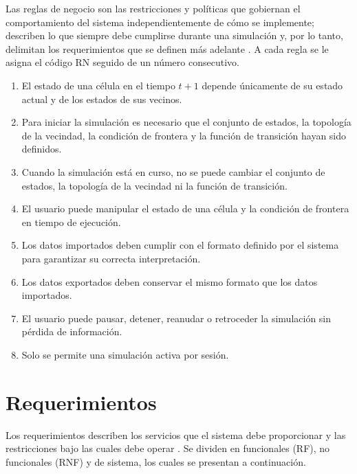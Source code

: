 Las reglas de negocio son las restricciones y políticas que gobiernan el comportamiento del sistema independientemente de cómo se implemente; describen lo que siempre debe cumplirse durante una simulación y, por lo tanto, delimitan los requerimientos que se definen más adelante \cite{ingenieria_1}. A cada regla se le asigna el código RN seguido de un número consecutivo.

\begin{enumerate}[label*=RN\arabic*, noitemsep]
	
	\item El estado de una célula en el tiempo $t + 1$ depende únicamente de su estado actual y de los estados de sus vecinos.
	
	\item Para iniciar la simulación es necesario que el conjunto de estados, la topología de la vecindad, la condición de frontera y la función de transición hayan sido definidos.
	
	\item Cuando la simulación está en curso, no se puede cambiar el conjunto de estados, la topología de la vecindad ni la función de transición.
	
	\item El usuario puede manipular el estado de una célula y la condición de frontera en tiempo de ejecución.
	
	\item Los datos importados deben cumplir con el formato definido por el sistema para garantizar su correcta interpretación.
	
	\item Los datos exportados deben conservar el mismo formato que los datos importados.
	
	\item El usuario puede pausar, detener, reanudar o retroceder la simulación sin pérdida de información. 
	
	\item Solo se permite una simulación activa por sesión.
	
\end{enumerate}

\section{Requerimientos}

Los requerimientos describen los servicios que el sistema debe proporcionar y las restricciones bajo las cuales debe operar \cite{ingenieria_1}. Se dividen en funcionales (RF), no funcionales (RNF) y de sistema, los cuales se presentan a continuación.

